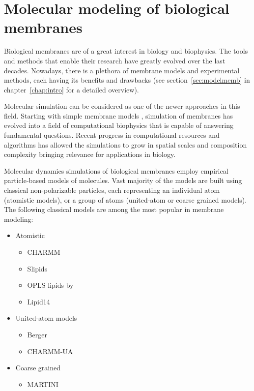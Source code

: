 \chapter{Molecular modeling of biological membranes}
\label{chap:methods}

Biological membranes are of a great interest in biology and biophysics. 
The tools and methods that enable their research have greatly evolved over the last decades. 
Nowadays, there is a plethora of membrane models and experimental methods, 
each having its benefits and drawbacks \citep{REF} 
(see section~\ref{sec:modelmemb} in chapter~\ref{chap:intro} for a detailed overview). 

Molecular simulation can be considered as one of the newer approaches in this field. 
Starting with simple membrane models \citep{REF} ,
simulation of membranes has evolved into a field of computational biophysics
that is capable of answering fundamental questions.
Recent progress in computational resources and algorithms
has allowed the simulations to grow in spatial scales and composition complexity
bringing relevance for applications in biology. \citep{REF: CECAM workshop} 

Molecular dynamics simulations of biological membranes employ empirical particle-based models of molecules. 
Vast majority of the models are built using classical non-polarizable particles, 
each representing an individual atom (atomistic models), 
or a group of atoms (united-atom or coarse grained models). 
The following classical models are among the most popular in membrane modeling:
\begin{itemize}
 \item Atomistic
 \begin{itemize}
   \item CHARMM \citep{klauda10}
   \item Slipids \citep{jambeck12, jambeck12b}
   \item OPLS lipids by \citet{maciejewski14}
   \item Lipid14 \citep{dickson14}
  \end{itemize}

 \item United-atom models
  \begin{itemize}
   \item Berger \citep{Berger97}
   \item CHARMM-UA \citep{lee14}
  \end{itemize}
 \item Coarse grained
 \begin{itemize}
   \item MARTINI \citep{marrink07}
  \end{itemize}
\end{itemize}

